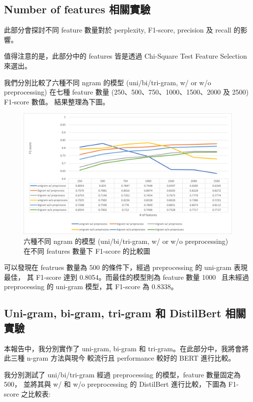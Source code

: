 \documentclass{article}[12pt]
\begin{document}
\subsection{Number of features 相關實驗}
此部分會探討不同 feature 數量對於 perplexity, F1-score, precision 及 recall
的影響。

值得注意的是，此部分中的 features 皆是透過 Chi-Square Test Feature Selection 來選出。

我們分別比較了六種不同 ngram 的模型 (uni/bi/tri-gram, w/ or w/o preprocessing)
在七種 feature 數量 (250、500、750、1000、1500、2000 及 2500) F1-score 數值。
結果整理為下圖。

\begin{figure}[H]
    \centering
    \includegraphics[width=\textwidth]{figure/features.png}
    \caption{六種不同 ngram 的模型 (uni/bi/tri-gram, w/ or w/o preprocessing) 在不同 features 數量下 F1-score 的比較圖}
\end{figure}

可以發現在 featrues 數量為 500 的條件下，經過 preprocessing 的 uni-gram 表現最佳，
其 F1-score 達到 0.8054。而最佳的模型則為 feature 數量 1000 \
且未經過 preprocessing 的 uni-gram 模型，其 F1-score 為 0.8338。



\subsection{Uni-gram, bi-gram, tri-gram 和 DistilBert 相關實驗}
本報告中，我分別實作了 uni-gram, bi-gram 和 tri-gram。在此部分中，我將會將此三種 n-gram 方法與現今
較流行且 performance 較好的 BERT 進行比較。

我分別測試了 uni/bi/tri-gram 經過 preprocessing 的模型，feature 數量固定為 500，
並將其與 w/ 和 w/o preprocessing 的 DistilBert 進行比較，下圖為 F1-score 之比較表:
\end{document}

